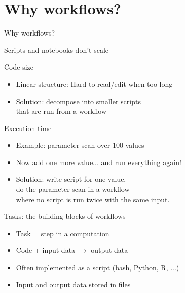 \documentclass[aspectratio=169]{beamer}
\begin{document}
\section*{Why workflows?}

\begin{frame}{}

  \begin{center}
  \Large Why workflows?
  \end{center}

\end{frame}

\begin{frame}{Scripts and notebooks don't scale}

  \begin{block}{Code size}
    \begin{itemize}
    \item Linear structure: Hard to read/edit when too long
    \item Solution: decompose into smaller scripts\\
          that are run from a workflow
    \end{itemize}
  \end{block}

  \pause

  \begin{block}{Execution time}
    \begin{itemize}
    \item Example: parameter scan over 100 values
    \item Now add one more value... and run everything again!
    \item Solution: write script for one value,\\
          do the parameter scan in a workflow \\
          where no script is run twice with the same input.
    \end{itemize}
  \end{block}

\end{frame}

\begin{frame}{Tasks: the building blocks of workflows}

  \begin{itemize}
  \item Task = step in a computation
  \item Code + input data $\rightarrow$ output data
  \item Often implemented as a script (bash, Python, R, ...)
  \item Input and output data stored in files
  \end{itemize}

\end{frame}
\end{document}
